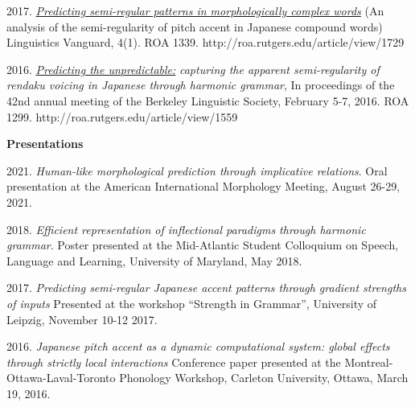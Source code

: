 \documentclass[11pt]{article}
\newcommand{\itt}[1]{\textit{#1}}
\newcommand{\bo}[1]{\textbf{#1}}
\newcommand{\bi}{\begin{itemize}}
\newcommand{\ii}{\item}
\newcommand{\ei}{\end{itemize}}
\begin{document}
\begin{enumerate}[label={[\arabic*]}]
\ii 2017. \href{http://roa.rutgers.edu/article/view/1729}{\textit{Predicting semi-regular patterns in morphologically complex words}} (An analysis of the semi-regularity of pitch accent in Japanese compound words) Linguistics Vanguard, 4(1). ROA 1339. http://roa.rutgers.edu/article/view/1729
\ii 2016. \href{http://roa.rutgers.edu/content/article/files/1559_rosen_1.pdf}{\textit{Predicting the unpredictable:}} \textit{capturing the apparent semi-regularity of rendaku voicing in Japanese through harmonic grammar}, In proceedings of the 42nd annual meeting of the Berkeley Linguistic Society, February 5-7, 2016. ROA 1299. http://roa.rutgers.edu/article/view/1559
\end{enumerate}

\noindent \bo{Presentations}


\begin{enumerate}[label={[P\arabic*]}]
\ii 2021. \textit{Human-like morphological prediction through implicative relations}. Oral presentation at  the American International Morphology Meeting, August 26-29, 2021.
\ii 2018. \itt{Efficient representation of inflectional paradigms through harmonic grammar}. Poster presented at the Mid-Atlantic Student Colloquium on Speech, Language and Learning, University of Maryland, May 2018.
\ii 2017. \textit{Predicting semi-regular Japanese accent patterns through gradient strengths of inputs} Presented at the workshop ``Strength in Grammar'', University of Leipzig, November 10-12 2017.
\ii 2016. \textit{Japanese pitch accent as a dynamic computational system: global effects through strictly local interactions} Conference paper presented at the Montreal-Ottawa-Laval-Toronto Phonology Workshop, Carleton University, Ottawa, March 19, 2016.
\end{enumerate}





\end{document}
